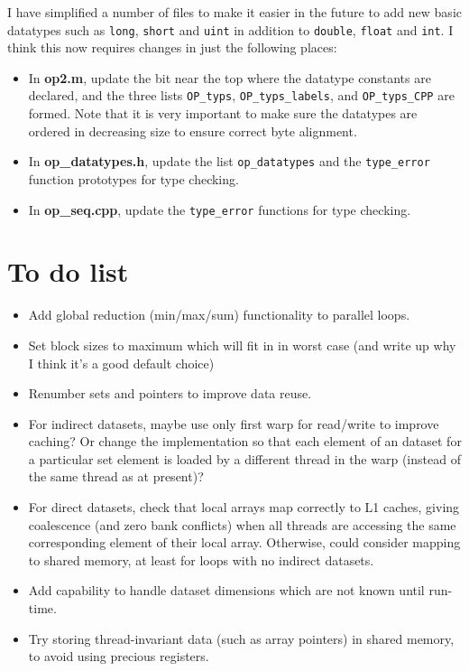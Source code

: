 \documentclass[12pt]{article}
\begin{document}
I have simplified a number of files to make it easier in the future to
add new basic datatypes such as {\tt long}, {\tt short} and {\tt uint}
in addition to {\tt double}, {\tt float} and {\tt int}.
I think this now requires changes in just the following places:
\begin{itemize}
\item
In {\bf op2.m}, update the bit near the top where the datatype constants 
are declared, and the three lists {\tt OP\_typs}, {\tt OP\_typs\_labels},
and {\tt OP\_typs\_CPP} are formed.  Note that it is very important to 
make sure the datatypes are ordered in decreasing size to ensure correct
byte alignment.

\item
In {\bf op\_datatypes.h}, update the list {\tt op\_datatypes} and the 
{\tt type\_error} function prototypes for type checking.

\item
In {\bf op\_seq.cpp}, update the {\tt type\_error} functions for type checking.
\end{itemize}


\newpage

\section{To do list}

\begin{itemize}
\item
Add global reduction (min/max/sum) functionality to parallel loops.

\item
Set block sizes to maximum which will fit in in worst case
(and write up why I think it's a good default choice)

\item
Renumber sets and pointers to improve data reuse.

\item
For indirect datasets, maybe use only first warp for read/write to 
improve caching?  Or change the implementation so that each element 
of an dataset for a particular set element is loaded by a different 
thread in the warp (instead of the same thread as at present)?

\item
For direct datasets, check that local arrays map correctly to L1 
caches, giving coalescence (and zero bank conflicts) when all threads 
are accessing the same corresponding element of their local array. 
Otherwise, could consider mapping to shared memory, at least for 
loops with no indirect datasets.

\item
Add capability to handle dataset dimensions which are not known
until run-time.

\item
Try storing thread-invariant data (such as array pointers)
in shared memory, to avoid using precious registers.
\end{itemize}
\end{document}

